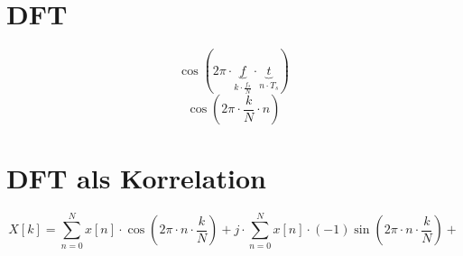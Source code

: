 \documentclass[a4,paper,fleqn]{article}
\begin{document}
\section{DFT}
\[ \cos(2 \pi \cdot \underbrace{f}_{k \cdot \frac{f_s}{N}} \cdot \underbrace{t}_{n \cdot T_s}) \]
\[ \cos\left(2 \pi \cdot \frac{k}{N} \cdot n\right) \]

\section{DFT als Korrelation}
\[ X[k] = 
        \sum\limits_{n = 0}^{N} x[n] \cdot     \cos\left(2 \pi \cdot n \cdot \frac{k}{N}\right) + 
j \cdot \sum\limits_{n = 0}^{N} x[n] \cdot (-1)\sin\left(2 \pi \cdot n \cdot \frac{k}{N}\right) + 
\]
\end{document}
